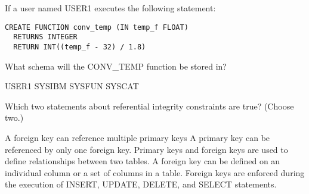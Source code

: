 \documentclass[11pt]{exam}
\begin{document}
\begin{questions}
\question[1]
If a user named USER1 executes the following statement:
\begin{verbatim}
CREATE FUNCTION conv_temp (IN temp_f FLOAT)
  RETURNS INTEGER
  RETURN INT((temp_f - 32) / 1.8)
\end{verbatim}
What schema will the CONV_TEMP function be stored in?
\begin{choices}
\choice USER1
\choice SYSIBM
\choice SYSFUN
\choice SYSCAT
\end{choices}

\question[1]
Which two statements about referential integrity constraints are true? (Choose two.)
\begin{choices}
\choice A foreign key can reference multiple primary keys
\choice A primary key can be referenced by only one foreign key.
\choice Primary keys and foreign keys are used to define relationships between two tables. 
\choice A foreign key can be defined on an individual column or a set of columns in a table.
\choice Foreign keys are enforced during the execution of INSERT, UPDATE, DELETE, and SELECT statements.
\end{choices}

\question[1]

\begin{choices}
\choice 
\choice 
\choice 
\choice 
\end{choices}


\question[1]

\begin{choices}
\choice 
\choice 
\choice 
\choice 
\end{choices}


\question[1]

\begin{choices}
\choice 
\choice 
\choice 
\choice 
\end{choices}





\end{questions}
\end{document}
